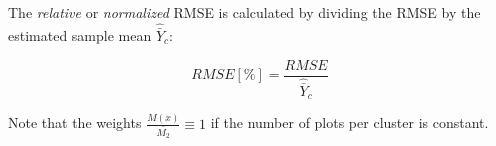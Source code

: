 \documentclass[remotesensing,article,submit,moreauthors,pdftex,10pt,a4paper]{mdpi}
\begin{document}
\noindent The \textit{relative} or \textit{normalized} RMSE is calculated by dividing the RMSE by the estimated sample mean $\hat{\bar{Y}}_c$:

\begin{equation*}\label{eq:NRMSE_clust}
RMSE[\%] = \frac{RMSE}{\hat{\bar{Y}}_c}
\end{equation*}

\noindent Note that the weights $\frac{M(x)}{\bar{M_2}} \equiv 1$ if the number of plots per cluster is constant.




\end{document}
